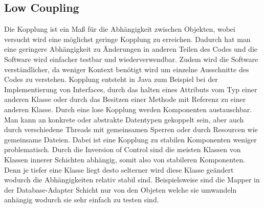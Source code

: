 \subsection{Low Coupling}
Die Kopplung ist ein Maß für die Abhängigkeit zwischen Objekten, wobei versucht wird eine möglichst geringe Kopplung zu erreichen.
Dadurch hat man eine geringere Abhängigkeit zu Änderungen in anderen Teilen des Codes und die Software wird einfacher testbar und wiederverwendbar.
Zudem wird die Software verständlicher, da weniger Kontext benötigt wird um einzelne Ausschnitte des Codes zu verstehen.
Kopplung entsteht in Java zum Beispiel bei der Implementierung von Interfaces,
durch das halten eines Attributs vom Typ einer anderen Klasse oder durch das Besitzen einer Methode mit Referenz zu einer anderen Klasse.
Durch eine lose Kopplung werden Komponenten austauschbar.
Man kann an konkrete oder abstrakte Datentypen gekoppelt sein, aber auch durch verschiedene Threads mit gemeinsamen Sperren oder durch Resourcen wie gemeinsame Dateien.
Dabei ist eine Kopplung zu stabilen Komponenten weniger problematisch.
Durch die Inversion of Control sind die meisten Klassen von Klassen innerer Schichten abhängig, somit also von stabileren Komponenten.
Denn je tiefer eine Klasse liegt desto selterner wird diese Klasse geändert wodurch die Abhängigkeiten relativ stabil sind.
Beispielsweise sind die Mapper in der Database-Adapter Schicht nur von den Objeten welche sie umwandeln anhängig wodurch sie sehr einfach zu testen sind.

